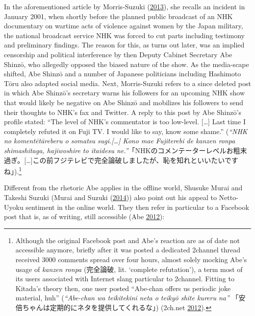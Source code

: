 \documentclass[10pt,british,A4paper,,openany]{memoir}
\begin{document}
In the aforementioned article by Morris-Suzuki
(\protect\hyperlink{ref-morris-suzuki_freedom_2013}{2013}), she recalls
an incident in January 2001, when shortly before the planned public
broadcast of an NHK documentary on wartime acts of violence against
women by the Japan military, the national broadcast service NHK was
forced to cut parts including testimony and preliminary findings. The
reason for this, as turns out later, was an implied censorship and
political interference by then Deputy Cabinet Secretary Abe Shinzō, who
allegedly opposed the biased nature of the show. As the media-scape
shifted, Abe Shinzō and a number of Japanese politicians including
Hashimoto Tōru also adapted social media. Next, Morris-Suzuki refers to
a since deleted post in which Abe Shinzō's secretary warns his followers
for an upcoming NHK show that would likely be negative on Abe Shinzō and
mobilizes his followers to send their thoughts to NHK's fax and Twitter.
A reply to this post by Abe Shinzō's profile stated: ``The level of
NHK's commentator is too low-level. {[}\ldots{}{]} Last time I
completely refuted it on Fuji TV. I would like to say, know some
shame.'' (\emph{``NHK no komentētāreberu o somatsu sugi.{[}\ldots{}{]}
Kono mae Fujiterebi de kanzen ronpa shimashitaga, hajiwoshire to
ītaidesu
ne.''}「NHKのコメンテーターレベルお粗末過ぎ。{[}\ldots{}{]}この前フジテレビで完全論破しましたが、恥を知れといいたいですね」).\footnote{Although
  the original Facebook post and Abe's reaction are as of date not
  accessible anymore, briefly after it was posted a dedicated 2channel
  thread received 3000 comments spread over four hours, almost solely
  mocking Abe's usage of \emph{kanzen ronpa} (完全論破, lit. `complete
  refutation'), a term most of its users associated with Internet slang
  particular to 2channel. Fitting to Kitada's theory then, one user
  posted ``Abe-chan offers us periodic joke material, huh''
  (\emph{``Abe-chan wa teikitekini neta o teikyō shite kureru na''}
  「安倍ちゃんは定期的にネタを提供してくれるな」) (2ch.net
  \protect\hyperlink{ref-2ch.net_eng._2012}{2012}).}

Different from the rhetoric Abe applies in the offline world, Shusuke
Murai and Takeshi Suzuki (Murai and Suzuki
(\protect\hyperlink{ref-hollihan_how_2014}{2014})) also point out his
appeal to Netto-Uyoku sentiment in the online world. They then refer in
particular to a Facebook post that is, as of writing, still accessible
(Abe \protect\hyperlink{ref-abe_1_2012}{2012}):
\end{document}
